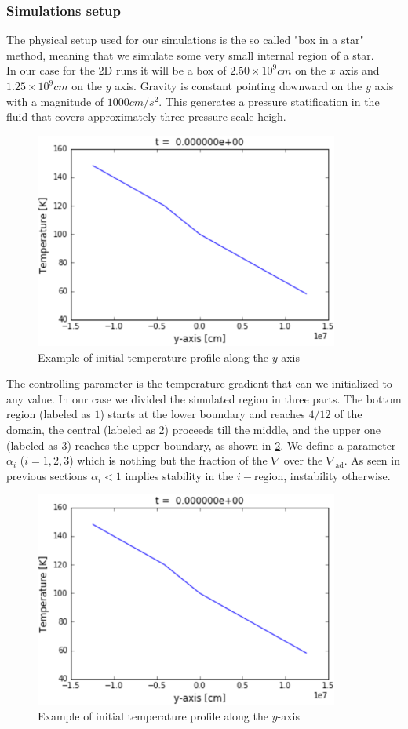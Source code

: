 \subsubsection{Simulations setup}
The physical setup used for our simulations is the so called "box in a star" method, meaning that we simulate some very small internal region of a star. \\
In our case for the 2D runs it will be a box of $2.50 \times 10^{9} cm$ on the $x$ axis and $1.25 \times 10^{9} cm$ on the $y$ axis. Gravity is constant pointing downward on the $y$ axis with a magnitude of $1000 cm/s^2$. This generates a pressure statification in the fluid that covers approximately three pressure scale heigh. \\
\begin{figure}[t]
\includegraphics[width=10cm]{./img/tempprofile}
\caption{Example of initial temperature profile along the $y$-axis}
\label{fig:tempprofile}
\centering
\end{figure}
The controlling parameter is the temperature gradient that can we initialized to any value. In our case we divided the simulated region in three parts. The bottom region (labeled as $1$) starts at the lower boundary and reaches $4/12$ of the domain, the central (labeled as $2$) proceeds till the middle, and the upper one (labeled as $3$) reaches the upper boundary, as shown in \ref{fig:tempprofile}. We define a parameter $\alpha_{i}$ ($i=1, 2, 3$) which is nothing but the fraction of the $\nabla$ over the $\nabla_{\mathrm{ad}}$. As seen in previous sections $\alpha_{i}<1$ implies stability in the $i-$region, instability otherwise. \\
\begin{figure}[t]
\includegraphics[width=10cm]{./img/tempprofile}
\caption{Example of initial temperature profile along the $y$-axis}
\label{fig:tempprofile}
\centering
\end{figure}
